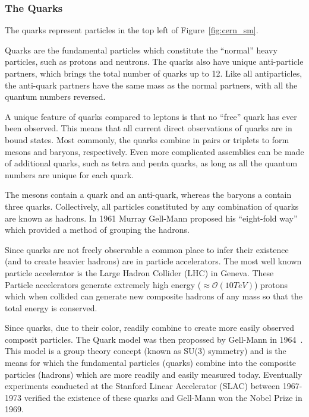 \subsubsection{The Quarks}

The quarks represent particles in the top left of Figure~\ref{fig:cern_sm}.

Quarks are the fundamental particles which constitute the ``normal'' heavy particles, such as protons and neutrons.
The quarks also have unique anti-particle partners, which brings the total number of quarks up to 12.
Like all antiparticles, the anti-quark partners have the same mass as the normal partners, with all the quantum numbers reversed.

A unique feature of quarks compared to leptons is that no ``free'' quark has ever been observed.
This means that all current direct observations of quarks are in bound states.
Most commonly, the quarks combine in pairs or triplets to form mesons and baryons, respectively.
Even more complicated assemblies can be made of additional quarks, such as tetra and penta quarks, as long as all the quantum numbers are unique for each quark.

The mesons contain a quark and an anti-quark, whereas the baryons a contain three quarks.
Collectively, all particles constituted by any combination of quarks are known as hadrons.
In 1961 Murray Gell-Mann proposed his ``eight-fold way''~\citep{eightfold_way_osti_4008239} which provided a method of grouping the hadrons.

Since quarks are not freely observable a common place to infer their existence (and to create heavier hadrons) are in particle accelerators.
The most well known particle accelerator is the Large Hadron Collider (LHC) in Geneva.
These Particle accelerators generate extremely high energy ($\approx \mathcal{O}(10 TeV)$) protons which when collided can generate new composite hadrons of any mass so that the total energy is conserved.

Since quarks, due to their color, readily combine to create more easily observed composit particles.
The Quark model was then propossed by Gell-Mann in 1964~\citep{quark_model_GELLMANN1964214}.
This model is a group theory concept (known as SU(3) symmetry) and is the means for which the fundamental particles (quarks) combine into the composite particles (hadrons) which are more readily and easily measured today.
Eventually experiments conducted at the Stanford Linear Accelerator (SLAC) between 1967-1973 verified the existence of these quarks and Gell-Mann won the Nobel Prize in 1969.

